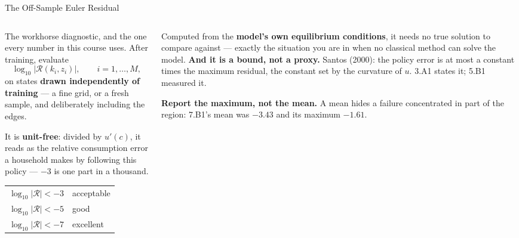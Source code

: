\begin{frame}{The Off-Sample Euler Residual}
\begin{columns}[T]
\begin{column}{0.54\textwidth}
\small
The workhorse diagnostic, and the one every number in this course uses. After training, evaluate
\[
  \log_{10}\bigl|\mathcal{R}(k_i,z_i)\bigr|,\qquad i=1,\dots,M,
\]
on states \textbf{drawn independently of training} --- a fine grid, or a fresh sample, and deliberately including the edges.
\medskip

It is \textbf{unit-free}: divided by $u'(c)$, it reads as the relative consumption error a household makes by following this policy --- $-3$ is one part in a thousand.
\smallskip

\begin{center}\footnotesize
\begin{tabularx}{\linewidth}{@{}>{\raggedright\arraybackslash}p{2.6cm} >{\raggedright\arraybackslash}X@{}}
\toprule
$\log_{10}|\mathcal{R}|<-3$ & acceptable \\
$\log_{10}|\mathcal{R}|<-5$ & good \\
$\log_{10}|\mathcal{R}|<-7$ & excellent \\
\bottomrule
\end{tabularx}
\end{center}
\end{column}
\begin{column}{0.43\textwidth}
\begin{takeawaybox}[title=\textbf{Why it is the right instrument}]\footnotesize
Computed from the \textbf{model's own equilibrium conditions}, it needs no true solution to compare against --- exactly the situation you are in when no classical method can solve the model.
\medskip
\textbf{And it is a bound, not a proxy.} Santos (2000): the policy error is at most a constant times the maximum residual, the constant set by the curvature of $u$. 3.A1 states it; 5.B1 measured it.
\end{takeawaybox}
\medskip
{\footnotesize \textbf{Report the maximum, not the mean.} A mean hides a failure concentrated in part of the region: 7.B1's mean was $-3.43$ and its maximum $-1.61$.}
\end{column}
\end{columns}
\vspace{1mm}
\end{frame}

